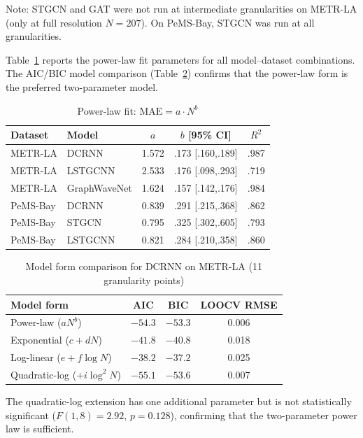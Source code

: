 \documentclass[letterpaper]{article}
\begin{document}
Note: STGCN and GAT were not run at intermediate granularities on METR-LA (only at full resolution $N = 207$). On PeMS-Bay, STGCN was run at all granularities.

Table~\ref{tab:powlaw_all} reports the power-law fit parameters for all model--dataset combinations. The AIC/BIC model comparison (Table~\ref{tab:aic}) confirms that the power-law form is the preferred two-parameter model.

\begin{table}[t]
\small
\centering
\caption{Power-law fit: $\text{MAE} = a \cdot N^b$}
\label{tab:powlaw_all}
\begin{tabular}{llccc}
\toprule
Dataset & Model & $a$ & $b$ [95\% CI] & $R^2$ \\
\midrule
METR-LA   & DCRNN        & 1.572 & .173 [.160,.189] & .987 \\
METR-LA   & LSTGCNN      & 2.533 & .176 [.098,.293] & .719 \\
METR-LA   & GraphWaveNet & 1.624 & .157 [.142,.176] & .984 \\
PeMS-Bay  & DCRNN        & 0.839 & .291 [.215,.368] & .862 \\
PeMS-Bay  & STGCN        & 0.795 & .325 [.302,.605] & .793 \\
PeMS-Bay  & LSTGCNN      & 0.821 & .284 [.210,.358] & .860 \\
\bottomrule
\end{tabular}
\end{table}

\begin{table}[t]
\small
\centering
\caption{Model form comparison for DCRNN on METR-LA (11 granularity points)}
\label{tab:aic}
\begin{tabular}{lccc}
\toprule
Model form & AIC & BIC & LOOCV RMSE \\
\midrule
Power-law ($a N^b$)             & $-54.3$ & $-53.3$ & 0.006 \\
Exponential ($c + dN$)          & $-41.8$ & $-40.8$ & 0.018 \\
Log-linear ($e + f\log N$)      & $-38.2$ & $-37.2$ & 0.025 \\
Quadratic-log ($+ i\log^2 N$)   & $-55.1$ & $-53.6$ & 0.007 \\
\bottomrule
\end{tabular}
\end{table}

The quadratic-log extension has one additional parameter but is not statistically significant ($F(1,8) = 2.92$, $p = 0.128$), confirming that the two-parameter power law is sufficient.
\end{document}
